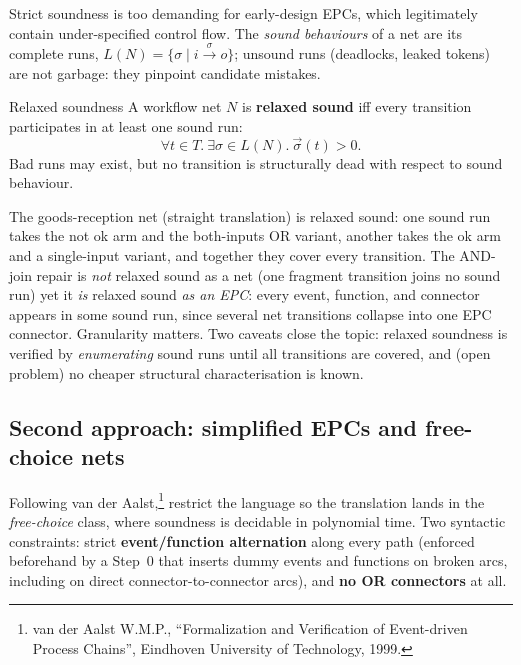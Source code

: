 Strict soundness is too demanding for early-design EPCs, which legitimately contain under-specified control flow. The \emph{sound behaviours} of a net are its complete runs, $L(N) = \{\sigma \mid i \xrightarrow{\sigma} o\}$; unsound runs (deadlocks, leaked tokens) are not garbage: they pinpoint candidate mistakes.

\begin{definitionbox}{Relaxed soundness}
A workflow net $N$ is \textbf{relaxed sound} iff every transition participates in at least one sound run:
\[
  \forall t \in T.\ \exists \sigma \in L(N).\ \vec{\sigma}(t) > 0.
\]
Bad runs may exist, but no transition is structurally dead with respect to sound behaviour.
\end{definitionbox}

The goods-reception net (straight translation) is relaxed sound: one sound run takes the \textsf{not ok} arm and the both-inputs OR variant, another takes the \textsf{ok} arm and a single-input variant, and together they cover every transition. The AND-join repair is \emph{not} relaxed sound as a net (one fragment transition joins no sound run) yet it \emph{is} relaxed sound \emph{as an EPC}: every event, function, and connector appears in some sound run, since several net transitions collapse into one EPC connector. Granularity matters. Two caveats close the topic: relaxed soundness is verified by \emph{enumerating} sound runs until all transitions are covered, and (open problem) no cheaper structural characterisation is known.

\subsection{Second approach: simplified EPCs and free-choice nets}

Following van der Aalst,\footnote{van der Aalst W.M.P., ``Formalization and Verification of Event-driven Process Chains'', Eindhoven University of Technology, 1999.} restrict the language so the translation lands in the \emph{free-choice} class, where soundness is decidable in polynomial time. Two syntactic constraints: strict \textbf{event/function alternation} along every path (enforced beforehand by a Step~0 that inserts dummy events and functions on broken arcs, including on direct connector-to-connector arcs), and \textbf{no OR connectors} at all.


